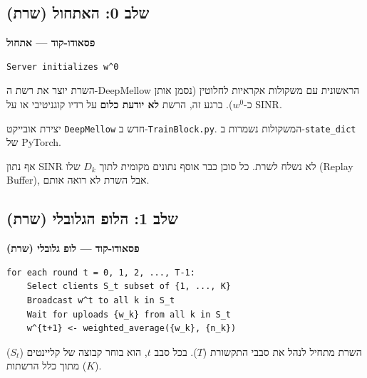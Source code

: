 \documentclass[11pt,a4paper]{article}
\newenvironment{infobox}[2][gray]{%
  \par\smallskip
  \begin{mdframed}[
    linecolor=#1!60!black,
    linewidth=0.7pt,
    backgroundcolor=#1!6,
    roundcorner=3pt,
    innertopmargin=7pt,
    innerbottommargin=7pt,
    innerleftmargin=8pt,
    innerrightmargin=8pt,
    skipabove=6pt,
    skipbelow=6pt
  ]%
  {\color{#1!70!black}\bfseries #2}\par\smallskip
}{%
  \end{mdframed}%
  \par\smallskip
}
\newenvironment{codebox}[1]{\begin{infobox}[gray]{#1}\begin{english}\setLTR}{\end{english}\end{infobox}}
\begin{document}
\subsection{שלב 0: האתחול (שרת)}
\label{subsec:step0-init}

\begin{codebox}{פסאודו-קוד --- אתחול}
\begin{lstlisting}[language={}]
Server initializes w^0
\end{lstlisting}
\end{codebox}

השרת יוצר את רשת ה-DeepMellow הראשונית עם משקולות אקראיות לחלוטין (נסמן אותן כ-$w^0$).
ברגע זה, הרשת \textbf{לא יודעת כלום} על רדיו קוגניטיבי או על SINR.

\begin{description}[style=nextline, leftmargin=2.8cm, labelwidth=2.5cm]
  \item[\textbf{בקוד}]
    יצירת אובייקט \texttt{DeepMellow} חדש ב-\texttt{TrainBlock.py}.
    המשקולות נשמרות ב-\texttt{state\_dict} של PyTorch.

  \item[\textbf{מה לא קורה}]
    אף נתון SINR לא נשלח לשרת.
    כל סוכן כבר אוסף נתונים מקומית לתוך $D_k$ שלו (Replay Buffer), אבל השרת לא רואה אותם.
\end{description}

\subsection{שלב 1: הלופ הגלובלי (שרת)}
\label{subsec:step1-global-loop}

\begin{codebox}{פסאודו-קוד --- לופ גלובלי (שרת)}
\begin{lstlisting}[language={}]
for each round t = 0, 1, 2, ..., T-1:
    Select clients S_t subset of {1, ..., K}
    Broadcast w^t to all k in S_t
    Wait for uploads {w_k} from all k in S_t
    w^{t+1} <- weighted_average({w_k}, {n_k})
\end{lstlisting}
\end{codebox}

השרת מתחיל לנהל את סבבי התקשורת ($T$).
בכל סבב $t$, הוא בוחר קבוצה של קליינטים ($S_t$) מתוך כלל הרשתות ($K$).
\end{document}

